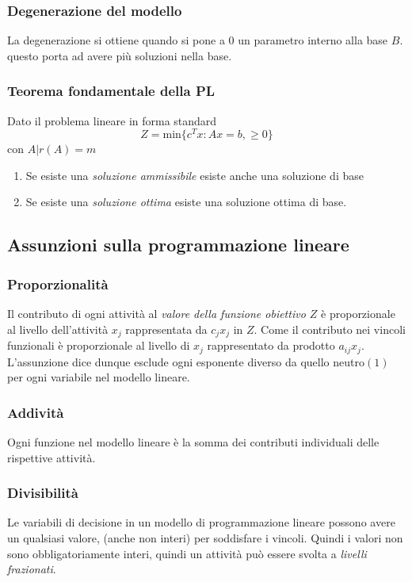 \documentclass{article}
\begin{document}
    \subsubsection{Degenerazione del modello} 
      La degenerazione si ottiene quando si pone a $0$ un parametro interno alla base $B$. questo porta ad avere più soluzioni nella base.

    \subsubsection{\textbf{Teorema fondamentale della PL}}
      Dato il problema lineare in forma standard
      $$Z=\text{min}\{c^Tx:Ax=b, \ge 0 \}$$
      con $A|r(A)=m$ 
      \begin{enumerate}
        \item Se esiste una \textit{soluzione ammissibile} esiste anche una soluzione di base
        \item Se esiste una \textit{soluzione ottima} esiste una soluzione ottima di base.
      \end{enumerate}

    \subsection{Assunzioni sulla programmazione lineare}
      
      \subsubsection{Proporzionalità}
        Il contributo di ogni attività al \textit{valore della funzione obiettivo $Z$} è proporzionale al livello dell'attività $x_j$ rappresentata da $c_jx_j$ in $Z$. Come il contributo nei vincoli funzionali è proporzionale al livello di $x_j$ rappresentato da prodotto $a_{ij}x_j$. L'assunzione dice dunque esclude ogni esponente diverso da quello neutro$(1)$ per ogni variabile nel modello lineare.

      \subsubsection{Addività}
        Ogni funzione nel modello lineare è la somma dei contributi individuali delle rispettive attività.

      \subsubsection{Divisibilità}
        Le variabili di decisione in un modello di programmazione lineare possono avere un qualsiasi valore, (anche non interi) per soddisfare i vincoli. Quindi i valori non sono obbligatoriamente interi, quindi un attività può essere svolta a \textit{livelli frazionati}.
\end{document}
